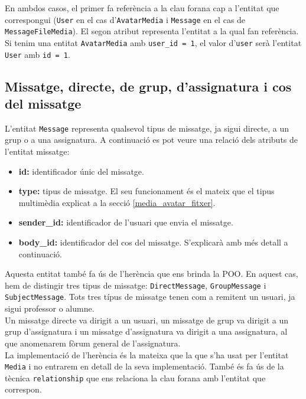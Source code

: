     En ambdos casos, el primer fa referència a la clau forana cap a l'entitat que correspongui (\texttt{User} en el cas d'\texttt{AvatarMedia} i \texttt{Message} en el cas de \texttt{MessageFileMedia}). El segon atribut representa l'entitat a la qual fan referència. Si tenim una entitat \texttt{AvatarMedia} amb \texttt{user\_id = 1}, el valor d'\texttt{user} serà l'entitat \texttt{User} amb \texttt{id = 1}.\\
   
    \subsection{Missatge, directe, de grup, d'assignatura i cos del missatge}\label{missatge_directe_grup_assignatura}
    
    L'entitat \texttt{Message} representa qualsevol tipus de missatge, ja sigui directe, a un grup o a una assignatura. A continuació es pot veure una relació dels atributs de l'entitat missatge:
    
    \begin{itemize}
    	\item \textbf{id:} identificador únic del missatge.
    	\item \textbf{type:} tipus de missatge. El seu funcionament és el mateix que el tipus multimèdia explicat a la secció \ref{media_avatar_fitxer}.
    	\item \textbf{sender\_id:} identificador de l'usuari que envia el missatge. 
    	\item \textbf{body\_id:} identificador del cos del missatge. S'explicarà amb més detall a continuació.
    \end{itemize}
    
     Aquesta entitat també fa ús de l'herència que ens brinda la \ac{POO}. En aquest cas, hem de distingir tres tipus de missatge: \texttt{DirectMessage}, \texttt{GroupMessage} i \texttt{SubjectMessage}. Tots tres típus de missatge tenen com a remitent un usuari, ja sigui professor o alumne. \\
     
     Un missatge directe va dirigit a un usuari, un missatge de grup va dirigit a un grup d'assignatura i un missatge d'assignatura va dirigit a una assignatura, al que anomenarem fòrum general de l'assignatura. \\
    
   	La implementació de l'herència és la mateixa que la que s'ha usat per l'entitat \texttt{Media} i no entrarem en detall de la seva implementació. També és fa ús de la tècnica \texttt{relationship} que ens relaciona la clau forana amb l'entitat que correspon. \\
   	
